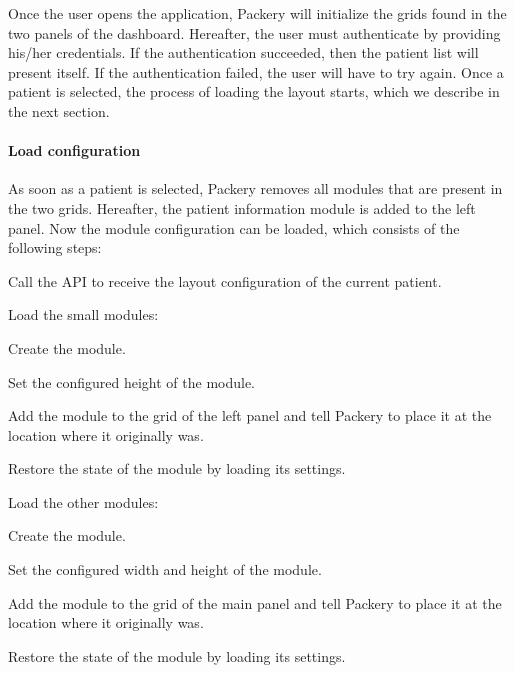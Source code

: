         Once the user opens the application, Packery will initialize the grids found in the two panels of the dashboard. Hereafter, the user must authenticate by providing his/her credentials. If the authentication succeeded, then the patient list will present itself. If the authentication failed, the user will have to try again. Once a patient is selected, the process of loading the layout starts, which we describe in the next section.


            \paragraph{Load configuration} As soon as a patient is selected, Packery removes all modules that are present in the two grids. Hereafter, the patient information module is added to the left panel. Now the module configuration can be loaded, which consists of the following steps:
            \vspace{-6pt}
            \begin{myenumerate}
                \item Call the API to receive the layout configuration of the current patient.
                \item Load the small modules:
                \begin{myenumerate}
                    \item Create the module.
                    \item Set the configured height of the module.
                    \item Add the module to the grid of the left panel and tell Packery to place it at the location where it originally was.
                    \item Restore the state of the module by loading its settings.
                \end{myenumerate}
                \item Load the other modules:
                \begin{myenumerate}
                    \item Create the module.
                    \item Set the configured width and height of the module.
                    \item Add the module to the grid of the main panel and tell Packery to place it at the location where it originally was.
                    \item Restore the state of the module by loading its settings.
                \end{myenumerate}
            \end{myenumerate}
            
